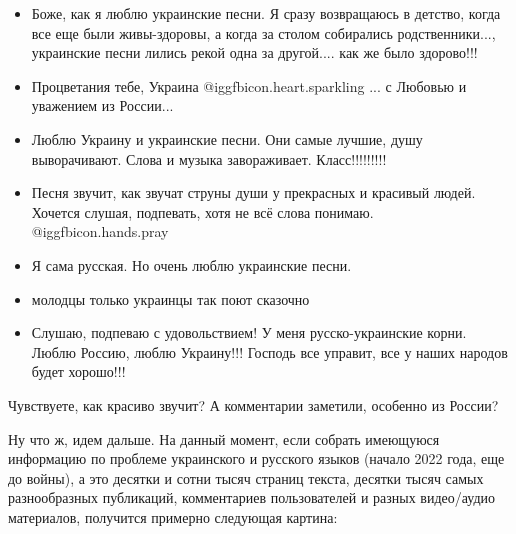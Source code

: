 \begin{itemize} %
\item Боже, как я люблю украинские песни. Я сразу возвращаюсь в детство, когда все
еще были живы-здоровы, а когда за столом собирались родственники..., украинские
песни лились рекой одна за другой.... как же было здорово!!!

\item Процветания тебе, Украина  @igg{fbicon.heart.sparkling} ... с Любовью и
уважением из России...

\item Люблю Украину и украинские песни. Они самые лучшие, душу выворачивают. Слова и
музыка завораживает. Класс!!!!!!!!!

\item Песня звучит, как звучат струны души у прекрасных и красивый людей. Хочется
слушая, подпевать, хотя  не  всё слова понимаю.  @igg{fbicon.hands.pray} 

\item Я сама русская. Но очень люблю украинские песни.

\item молодцы только украинцы так поют сказочно

\item Слушаю, подпеваю с удовольствием! У меня русско-украинские корни. Люблю Россию,
люблю Украину!!! Господь все управит, все у наших народов будет хорошо!!!
\end{itemize} %

Чувствуете, как красиво звучит? А комментарии заметили, особенно из России?

Ну что ж, идем дальше. На данный момент, если собрать имеющуюся информацию
по проблеме украинского и русского языков (начало 2022 года, еще до войны), а
это десятки и сотни тысяч страниц текста, десятки тысяч самых разнообразных
публикаций, комментариев пользователей и разных видео/аудио материалов,
получится примерно следующая картина:


